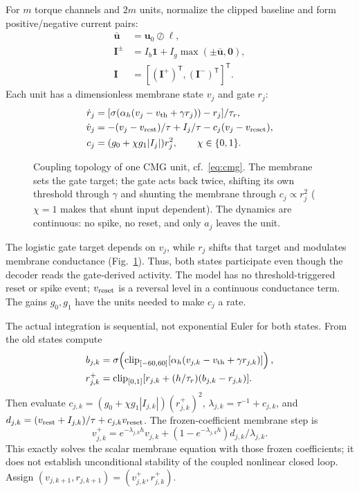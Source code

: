 \documentclass[letterpaper, 10 pt, conference]{ieeeconf}
\newcommand{\T}{^{\mathsf T}}
\newcommand{\clip}{\operatorname{clip}}
\begin{document}
For $m$ torque channels and $2m$ units, normalize the clipped baseline and
form positive/negative current pairs:
\begin{equation}
 \begin{aligned}
 \bar{\bm u}&=\bm u_0\oslash\bm\ell,\\
 \bm I^{\pm}&=I_b\bm1+I_g\max(\pm\bar{\bm u},\bm0),\\
 \bm I&=[(\bm I^+)\T,(\bm I^-)\T]\T.
 \end{aligned}
 \label{eq:encoding}
\end{equation}
Each unit has a dimensionless membrane state $v_j$ and gate $r_j$:
\begin{align}
 \dot r_j&=[\sigma(\alpha_h(v_j-v_{\rm th}+\gamma r_j))-r_j]/\tau_r,\\
 \dot v_j&=-(v_j-v_{\rm rest})/\tau+I_j/\tau-c_j(v_j-v_{\rm reset}),\\
 c_j&=(g_0+\chi g_1|I_j|)r_j^2,\qquad \chi\in\{0,1\}.
 \label{eq:cmg}
\end{align}
\begin{figure}[t]
\centering
\resizebox{0.86\columnwidth}{!}{}
\caption{Coupling topology of one CMG unit, cf.~\eqref{eq:cmg}. The
membrane sets the gate target; the gate acts back twice, shifting its own
threshold through $\gamma$ and shunting the membrane through
$c_j\propto r_j^2$ ($\chi=1$ makes that shunt input dependent). The
dynamics are continuous: no spike, no reset, and only $a_j$ leaves the
unit.}
\label{fig:cmgunit}
\end{figure}
%
The logistic gate target depends on $v_j$, while $r_j$ shifts that target
and modulates membrane conductance (Fig.~\ref{fig:cmgunit}). Thus, both states participate even
though the decoder reads the gate-derived activity. The model has no
threshold-triggered reset or spike event; $v_{\rm reset}$ is a reversal
level in a continuous conductance term. The gains $g_0,g_1$ have the units
needed to make $c_j$ a rate.

The actual integration is sequential, not exponential Euler for both
states. From the old states compute
\begin{align}
 b_{j,k}&=\sigma\!\left(\clip_{[-60,60]}
       [\alpha_h(v_{j,k}-v_{\rm th}+\gamma r_{j,k})]\right),\\
 r_{j,k}^{+}&=\clip_{[0,1]}
       [r_{j,k}+(h/\tau_r)(b_{j,k}-r_{j,k})].
 \label{eq:gate_step}
\end{align}
Then evaluate $c_{j,k}=(g_0+\chi g_1|I_{j,k}|)(r_{j,k}^{+})^2$,
$\lambda_{j,k}=\tau^{-1}+c_{j,k}$, and
$d_{j,k}=(v_{\rm rest}+I_{j,k})/\tau+c_{j,k}v_{\rm reset}$. The
frozen-coefficient membrane step is
\begin{equation}
 v_{j,k}^{+}=e^{-\lambda_{j,k}h}v_{j,k}
       +(1-e^{-\lambda_{j,k}h})d_{j,k}/\lambda_{j,k}.
 \label{eq:mem_step}
\end{equation}
This exactly solves the scalar membrane equation with those frozen
coefficients; it does not establish unconditional stability of the coupled
nonlinear closed loop. Assign $(v_{j,k+1},r_{j,k+1})=(v_{j,k}^{+},r_{j,k}^{+})$.
\end{document}
